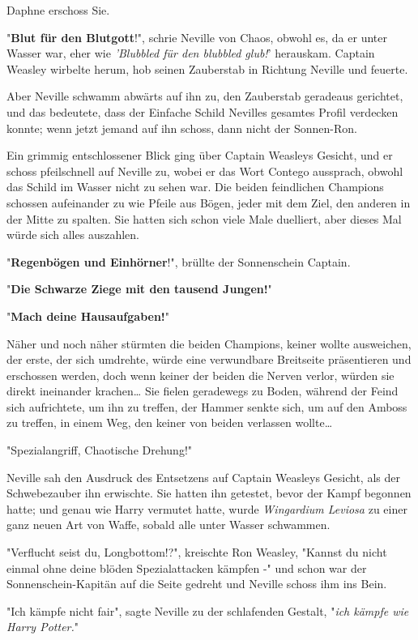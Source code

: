 {Daphne erschoss Sie.

"\textbf{Blut für den Blutgott}!", schrie Neville von Chaos, obwohl es, da er unter Wasser war, eher wie \emph{'Blubbled für den blubbled glub!}' herauskam. Captain Weasley wirbelte herum, hob seinen Zauberstab in Richtung Neville und feuerte.

Aber Neville schwamm abwärts auf ihn zu, den Zauberstab geradeaus gerichtet, und das bedeutete, dass der Einfache Schild Nevilles gesamtes Profil verdecken konnte; wenn jetzt jemand auf ihn schoss, dann nicht der Sonnen-Ron.

Ein grimmig entschlossener Blick ging über Captain Weasleys Gesicht, und er schoss pfeilschnell auf Neville zu, wobei er das Wort Contego aussprach, obwohl das Schild im Wasser nicht zu sehen war. Die beiden feindlichen Champions schossen aufeinander zu wie Pfeile aus Bögen, jeder mit dem Ziel, den anderen in der Mitte zu spalten. Sie hatten sich schon viele Male duelliert, aber dieses Mal würde sich alles auszahlen.

"\textbf{Regenbögen und Einhörner}!", brüllte der Sonnenschein Captain.

"\textbf{Die Schwarze Ziege mit den tausend Jungen!}"

"\textbf{Mach deine Hausaufgaben!}"

Näher und noch näher stürmten die beiden Champions, keiner wollte ausweichen, der erste, der sich umdrehte, würde eine verwundbare Breitseite präsentieren und erschossen werden, doch wenn keiner der beiden die Nerven verlor, würden sie direkt ineinander krachen… Sie fielen geradewegs zu Boden, während der Feind sich aufrichtete, um ihn zu treffen, der Hammer senkte sich, um auf den Amboss zu treffen, in einem Weg, den keiner von beiden verlassen wollte…

"Spezialangriff, Chaotische Drehung!"

Neville sah den Ausdruck des Entsetzens auf Captain Weasleys Gesicht, als der Schwebezauber ihn erwischte. Sie hatten ihn getestet, bevor der Kampf begonnen hatte; und genau wie Harry vermutet hatte, wurde \emph{Wingardium Leviosa} zu einer ganz neuen Art von Waffe, sobald alle unter Wasser schwammen.

"Verflucht seist du, Longbottom!?", kreischte Ron Weasley, "Kannst du nicht einmal ohne deine blöden Spezialattacken kämpfen -" und schon war der Sonnenschein-Kapitän auf die Seite gedreht und Neville schoss ihm ins Bein.

"Ich kämpfe nicht fair", sagte Neville zu der schlafenden Gestalt, "\emph{ich kämpfe wie Harry Potter.}"

}
